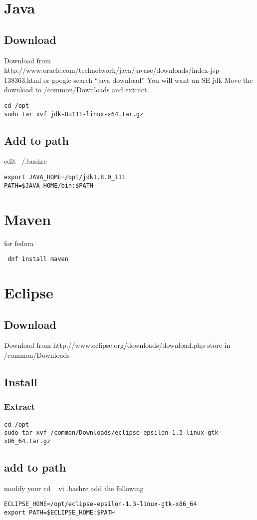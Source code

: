 \section{Java}
\subsection{Download}
Download from http://www.oracle.com/technetwork/java/javase/downloads/index-jsp-138363.html or google search ``java download''
You will want an SE jdk
Move the download to /common/Downloads and extract.
\begin{verbatim}
cd /opt
sudo tar xvf jdk-8u111-linux-x64.tar.gz 
\end{verbatim}
\subsection{Add to path}
edit ~/.bashrc 
\begin{verbatim}
export JAVA_HOME=/opt/jdk1.8.0_111
PATH=$JAVA_HOME/bin:$PATH
\end{verbatim}

\section{Maven}
for fedora 
\begin{verbatim}
 dnf install maven
\end{verbatim}

\section{Eclipse}
\subsection{Download}
Download from http://www.eclipse.org/downloads/download.php
store in /common/Downloads
\subsection{Install}
\subsubsection{Extract}
\begin{verbatim}
cd /opt
sudo tar xvf /common/Downloads/eclipse-epsilon-1.3-linux-gtk-x86_64.tar.gz 
\end{verbatim}
\subsection{add to path}
modify your 
cd ~
vi .bashrc
add the following
\begin{verbatim}
ECLIPSE_HOME=/opt/eclipse-epsilon-1.3-linux-gtk-x86_64
export PATH=$ECLIPSE_HOME:$PATH
\end{verbatim}
